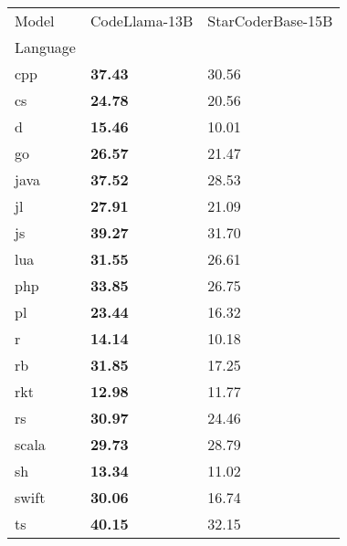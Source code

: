 
\begin{tabular}{lll}
\toprule
Model & CodeLlama-13B & StarCoderBase-15B \\
Language &  &  \\
\midrule
cpp & \textbf{37.43} & 30.56 \\
cs & \textbf{24.78} & 20.56 \\
d & \textbf{15.46} & 10.01 \\
go & \textbf{26.57} & 21.47 \\
java & \textbf{37.52} & 28.53 \\
jl & \textbf{27.91} & 21.09 \\
js & \textbf{39.27} & 31.70 \\
lua & \textbf{31.55} & 26.61 \\
php & \textbf{33.85} & 26.75 \\
pl & \textbf{23.44} & 16.32 \\
r & \textbf{14.14} & 10.18 \\
rb & \textbf{31.85} & 17.25 \\
rkt & \textbf{12.98} & 11.77 \\
rs & \textbf{30.97} & 24.46 \\
scala & \textbf{29.73} & 28.79 \\
sh & \textbf{13.34} & 11.02 \\
swift & \textbf{30.06} & 16.74 \\
ts & \textbf{40.15} & 32.15 \\
\bottomrule
\end{tabular}
